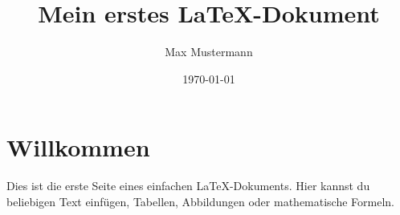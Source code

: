 \documentclass[a4paper,12pt]{article}
\begin{document}
\title{Mein erstes LaTeX-Dokument}
\author{Max Mustermann}
\date{\today}

\maketitle

\section*{Willkommen}

Dies ist die erste Seite eines einfachen LaTeX-Dokuments.  
Hier kannst du beliebigen Text einfügen, Tabellen, Abbildungen oder mathematische Formeln.
\end{document}
